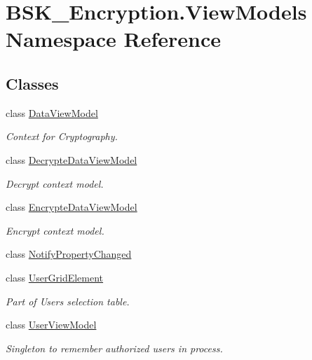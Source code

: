 \hypertarget{namespace_b_s_k___encryption_1_1_view_models}{}\section{B\+S\+K\+\_\+\+Encryption.\+View\+Models Namespace Reference}
\label{namespace_b_s_k___encryption_1_1_view_models}
\subsection*{Classes}
\begin{DoxyCompactItemize}
\item 
class \mbox{\hyperlink{class_b_s_k___encryption_1_1_view_models_1_1_data_view_model}{Data\+View\+Model}}
\begin{DoxyCompactList}\small\item\em Context for Cryptography. \end{DoxyCompactList}\item 
class \mbox{\hyperlink{class_b_s_k___encryption_1_1_view_models_1_1_decrypte_data_view_model}{Decrypte\+Data\+View\+Model}}
\begin{DoxyCompactList}\small\item\em Decrypt context model. \end{DoxyCompactList}\item 
class \mbox{\hyperlink{class_b_s_k___encryption_1_1_view_models_1_1_encrypte_data_view_model}{Encrypte\+Data\+View\+Model}}
\begin{DoxyCompactList}\small\item\em Encrypt context model. \end{DoxyCompactList}\item 
class \mbox{\hyperlink{class_b_s_k___encryption_1_1_view_models_1_1_notify_property_changed}{Notify\+Property\+Changed}}
\item 
class \mbox{\hyperlink{class_b_s_k___encryption_1_1_view_models_1_1_user_grid_element}{User\+Grid\+Element}}
\begin{DoxyCompactList}\small\item\em Part of Users selection table. \end{DoxyCompactList}\item 
class \mbox{\hyperlink{class_b_s_k___encryption_1_1_view_models_1_1_user_view_model}{User\+View\+Model}}
\begin{DoxyCompactList}\small\item\em Singleton to remember authorized users in process. \end{DoxyCompactList}\end{DoxyCompactItemize}

